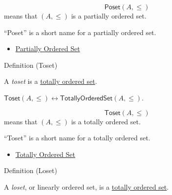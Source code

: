 \begin{remark*}
\[
  \mathsf{Poset}(A,\leq)
\] means that $(A,\leq)$ is a partially ordered set.
\end{remark*}

\begin{remark*}[Interpretation]
``Poset'' is a short name for a partially ordered set.
\end{remark*}

\begin{dependencies}
\begin{itemize}
  \item \hyperref[def:partially-ordered-set]{Partially Ordered Set}
\end{itemize}
\end{dependencies}

\begin{definitionbox}{Definition (Toset)}
\begin{definition}[Toset]\label{def:toset}
A \emph{toset} is a \hyperref[def:totally-ordered-set]{totally ordered set}.
\end{definition}
\end{definitionbox}

\begin{remark*}
$\mathsf{Toset}(A,\leq)\leftrightarrow
\mathsf{TotallyOrderedSet}(A,\leq)$.
\end{remark*}

\begin{remark*}
\[
  \mathsf{Toset}(A,\leq)
\] means that $(A,\leq)$ is a totally ordered set.
\end{remark*}

\begin{remark*}[Interpretation]
``Toset'' is a short name for a totally ordered set.
\end{remark*}

\begin{dependencies}
\begin{itemize}
  \item \hyperref[def:totally-ordered-set]{Totally Ordered Set}
\end{itemize}
\end{dependencies}

\begin{definitionbox}{Definition (Loset)}
\begin{definition}[Loset]\label{def:loset}
A \emph{loset}, or linearly ordered set, is a
\hyperref[def:totally-ordered-set]{totally ordered set}.
\end{definition}
\end{definitionbox}

